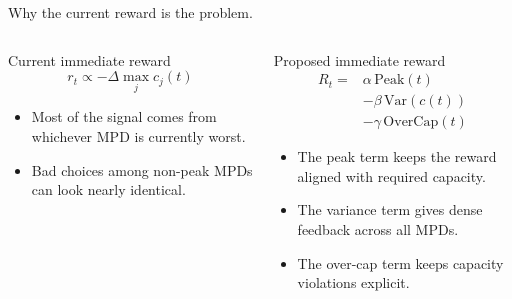 \documentclass[11pt,aspectratio=43]{beamer}
\begin{document}
\begin{frame}{Why the current reward is the problem.}
  \begin{columns}[T,onlytextwidth]
        \begin{block}{Current immediate reward}
          \[
          r_t \propto -\Delta \max_j c_j(t)
          \]
          \begin{itemize}
            \item Most of the signal comes from whichever MPD is currently worst.
            \item Bad choices among non-peak MPDs can look nearly identical.
          \end{itemize}
        \end{block}
        \begin{block}{Proposed immediate reward}
          \[
          \begin{aligned}
          R_t ={}& \alpha \,\text{Peak}(t) \\
                &- \beta \,\mathrm{Var}(c(t)) \\
                &- \gamma \,\text{OverCap}(t)
          \end{aligned}
          \]
          \begin{itemize}
            \item The peak term keeps the reward aligned with required capacity.
            \item The variance term gives dense feedback across all MPDs.
            \item The over-cap term keeps capacity violations explicit.
          \end{itemize}
      \end{block}
  \end{columns}
\end{frame}
\end{document}
